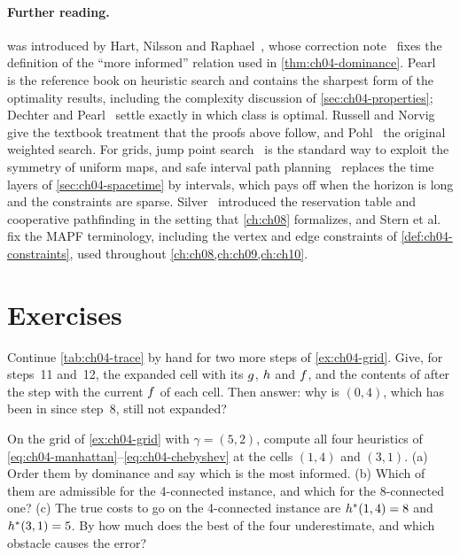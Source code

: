 \paragraph{Further reading.}
\astar was introduced by Hart, Nilsson and Raphael~\cite{hart1968formal}, whose
correction note~\cite{hart1972correction} fixes the definition of the ``more
informed'' relation used in \cref{thm:ch04-dominance}.
Pearl~\cite{pearl1984heuristics} is the reference book on heuristic search and
contains the sharpest form of the optimality results, including the
complexity discussion of \cref{sec:ch04-properties}; Dechter and
Pearl~\cite{dechter1985generalized} settle exactly in which class \astar is
optimal. Russell and Norvig~\cite{russell2020aima} give the textbook treatment
that the proofs above follow, and Pohl~\cite{pohl1970heuristic} the original
weighted search. For grids, jump point search~\cite{harabor2011jps} is the
standard way to exploit the symmetry of uniform maps, and safe interval path
planning~\cite{phillips2011sipp} replaces the time layers of
\cref{sec:ch04-spacetime} by intervals, which pays off when the horizon is long
and the constraints are sparse. Silver~\cite{silver2005cooperative} introduced
the reservation table and cooperative pathfinding in the setting that
\cref{ch:ch08} formalizes, and Stern et al.~\cite{stern2019mapf} fix the MAPF
terminology, including the vertex and edge constraints of
\cref{def:ch04-constraints}, used throughout \cref{ch:ch08,ch:ch09,ch:ch10}.

\section{Exercises}
\label{sec:ch04-exercises}

\begin{exercise}[\difficulty{1}]
\label{exr:ch04-trace}
Continue \cref{tab:ch04-trace} by hand for two more steps of \cref{ex:ch04-grid}.
Give, for steps~11 and~12, the expanded cell with its $g$, $h$ and
$f$, and the contents of \Open after the step with the current $f$ of
each cell. Then answer: why is $(0,4)$, which has been in \Open since step~8,
still not expanded?
\end{exercise}

\begin{exercise}[\difficulty{1}]
\label{exr:ch04-fourheuristics}
On the grid of \cref{ex:ch04-grid} with $\gamma = (5,2)$, compute all four
heuristics of \cref{eq:ch04-manhattan}--\cref{eq:ch04-chebyshev} at the cells
$(1,4)$ and $(3,1)$. (a) Order them by dominance and say which is the most
informed. (b) Which of them are admissible for the 4-connected instance, and
which for the 8-connected one? (c) The true costs to go on the
4-connected instance are $h^*(1,4) = 8$ and $h^*(3,1) = 5$. By how
much does the best of the four underestimate, and which obstacle causes the
error?
\end{exercise}


